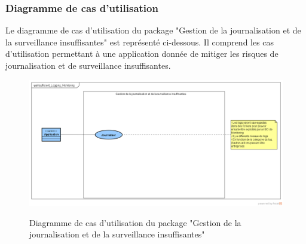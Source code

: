 \subsubsection{Diagramme de cas d'utilisation}
Le diagramme de cas d'utilisation du package "Gestion de la journalisation et de la surveillance insuffisantes" est représenté ci-dessous. Il comprend les cas d'utilisation permettant à une application donnée de mitiger les risques de journalisation et de surveillance insuffisantes.\\ 
\begin{figure}[H]
	\centering
	\begin{minipage}{12cm}
		\centering
		{\includegraphics[height=0.30\textheight]{fig/Insufficient-logging-monitoring-use-case-diagram.png}}
	\end{minipage}
	\caption{Diagramme de cas d'utilisation du package "Gestion de la journalisation et de la surveillance insuffisantes"}
	\label{fig:7.11}
\end{figure}

